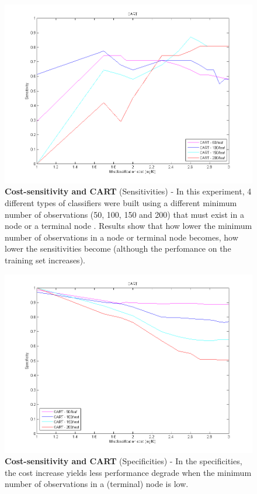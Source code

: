 \newpage
\begin{figure}[h]
\includegraphics[scale=0.65]{img/CART_sens.png}
\caption{\textbf{Cost-sensitivity and CART}  (Sensitivities) - In this experiment, 4 different types of classifiers were built using a different minimum number of observations (50, 100, 150 and 200) that must exist in a node or a terminal node . Results show that how lower the minimum number of observations in a node or terminal node becomes, how lower the sensitivities become (although the perfomance on the training set increases). }
\end{figure}

\newpage



\begin{figure}[h]
\includegraphics[scale=0.65]{img/CART_spec.png}
\caption{\textbf{Cost-sensitivity and CART} (Specificities) - In the specificities, the cost increase yields less performance degrade when the minimum number of observations in a (terminal) node is low.}
\end{figure}


